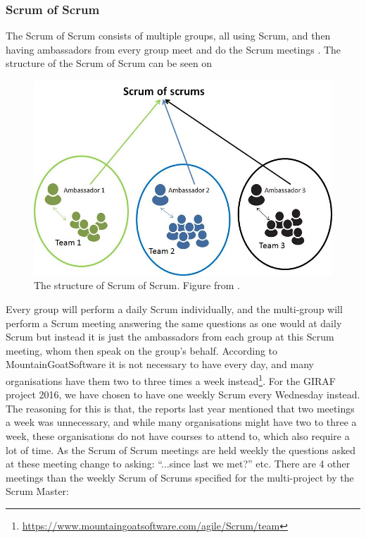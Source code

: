 \subsubsection*{Scrum of Scrum}
The Scrum of Scrum consists of multiple groups, all using Scrum, and then having ambassadors from every group meet and do the Scrum meetings \cite{ScrumBOOK}.
The structure of the Scrum of Scrum can be seen on 

\begin{figure}
\centering
\includegraphics[scale=0.4]{figures/ScrumofScrum.png}
\caption{The structure of Scrum of Scrum. Figure from \cite{ScrumofScrumfigure}.}
\label{fig:ScrumofScrum}
\end{figure}

Every group will perform a daily Scrum individually, and the multi-group will perform a Scrum meeting answering the same questions as one would at daily Scrum but instead it is just the ambassadors from each group at this Scrum meeting, whom then speak on the group's behalf.
According to MountainGoatSoftware it is not necessary to have every day, and many organisations have them two to three times a week instead\footnote{\url{https://www.mountaingoatsoftware.com/agile/Scrum/team}}.
For the GIRAF project 2016, we have chosen to have one weekly Scrum every Wednesday instead.
The reasoning for this is that, the reports last year mentioned that two meetings a week was unnecessary, and while many organisations might have two to three a week, these organisations do not have courses to attend to, which also require a lot of time.
As the Scrum of Scrum meetings are held weekly the questions asked at these meeting change to asking: ``...since last we met?'' etc.
There are 4 other meetings than the weekly Scrum of Scrums specified for the multi-project by the Scrum Master:

